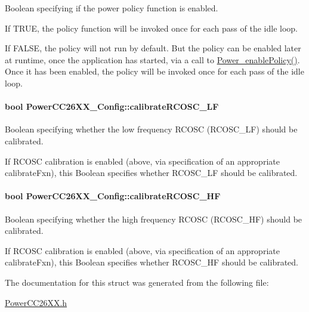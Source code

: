 Boolean specifying if the power policy function is enabled. 

If \textquotesingle{}T\+R\+U\+E\textquotesingle{}, the policy function will be invoked once for each pass of the idle loop.

If \textquotesingle{}F\+A\+L\+S\+E\textquotesingle{}, the policy will not run by default. But the policy can be enabled later at runtime, once the application has started, via a call to \hyperlink{_power_8h_ae8d6092a8fb35b6db52a69a35fcc327f}{Power\+\_\+enable\+Policy()}. Once it has been enabled, the policy will be invoked once for each pass of the idle loop. 
\paragraph[{calibrate\+R\+C\+O\+S\+C\+\_\+\+L\+F}]{\setlength{\rightskip}{0pt plus 5cm}bool Power\+C\+C26\+X\+X\+\_\+\+Config\+::calibrate\+R\+C\+O\+S\+C\+\_\+\+L\+F}\label{struct_power_c_c26_x_x___config_ae5541ad9e9fb883e9bdf9c68d1c0226b}


Boolean specifying whether the low frequency R\+C\+O\+S\+C (R\+C\+O\+S\+C\+\_\+\+L\+F) should be calibrated. 

If R\+C\+O\+S\+C calibration is enabled (above, via specification of an appropriate calibrate\+Fxn), this Boolean specifies whether R\+C\+O\+S\+C\+\_\+\+L\+F should be calibrated. 
\paragraph[{calibrate\+R\+C\+O\+S\+C\+\_\+\+H\+F}]{\setlength{\rightskip}{0pt plus 5cm}bool Power\+C\+C26\+X\+X\+\_\+\+Config\+::calibrate\+R\+C\+O\+S\+C\+\_\+\+H\+F}\label{struct_power_c_c26_x_x___config_a896b6c56c0d1be28de7ce4ef09fe616a}


Boolean specifying whether the high frequency R\+C\+O\+S\+C (R\+C\+O\+S\+C\+\_\+\+H\+F) should be calibrated. 

If R\+C\+O\+S\+C calibration is enabled (above, via specification of an appropriate calibrate\+Fxn), this Boolean specifies whether R\+C\+O\+S\+C\+\_\+\+H\+F should be calibrated. 

The documentation for this struct was generated from the following file\+:\begin{DoxyCompactItemize}
\item 
\hyperlink{_power_c_c26_x_x_8h}{Power\+C\+C26\+X\+X.\+h}\end{DoxyCompactItemize}
